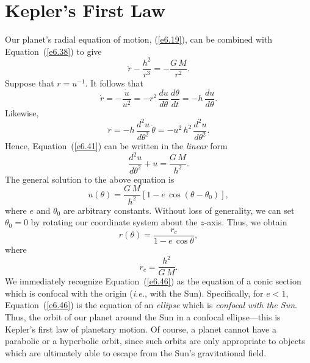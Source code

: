 \section{Kepler's First Law}
Our planet's radial equation of motion, (\ref{e6.19}), can be combined with
Equation~(\ref{e6.38}) to give
\begin{equation}\label{e6.41}
\ddot{r} -\frac{h^2}{r^3}= - \frac{G\,M}{r^2}.
\end{equation}
Suppose that $r = u^{-1}$. It follows that
\begin{equation}\label{e6.42}
\dot{r} = - \frac{\dot{u}}{u^2} = - r^2\,\frac{du}{d\theta}\,\frac{d\theta}{dt} = - h\,\frac{du}{d\theta}.
\end{equation}
Likewise,
\begin{equation}
\ddot{r} = - h \,\frac{d^2 u}{d\theta^2}\,\dot{\theta} = - u^2\,h^2\,\frac{d^2 u}{d\theta^2}.
\end{equation}
Hence, Equation~(\ref{e6.41}) can be written in the {\em linear}\/ form
\begin{equation}\label{e6.44}
\frac{d^2 u}{d\theta^2} + u = \frac{G\,M}{h^2}.
\end{equation}
The general solution to the above equation is
\begin{equation}\label{e6.45}
u(\theta) = \frac{G\,M}{h^2}\left[1 - e\,\cos(\theta-\theta_0)\right],
\end{equation}
where $e$ and $\theta_0$ are arbitrary constants. Without loss of generality, we can
set $\theta_0=0$ by rotating our coordinate system about the $z$-axis. Thus,
we obtain
\begin{equation}\label{e6.46}
r(\theta) = \frac{r_c}{1 - e\,\cos\theta},
\end{equation}
where
\begin{equation}\label{e6.47}
r_c = \frac{h^2}{G\,M}.
\end{equation}
We immediately recognize Equation~(\ref{e6.46}) as the equation of a conic
section which is confocal with the origin ({\em i.e.}, with the Sun).
Specifically, for $e<1$, Equation~(\ref{e6.46}) is the equation of an {\em ellipse}\/
which is {\em confocal with the Sun}. Thus, the orbit of our planet
around the Sun in a confocal ellipse---this is Kepler's first law
of planetary motion. Of course, a planet cannot have a parabolic
or a hyperbolic orbit, since such orbits are only appropriate to objects which are ultimately able to escape from the Sun's gravitational field.

